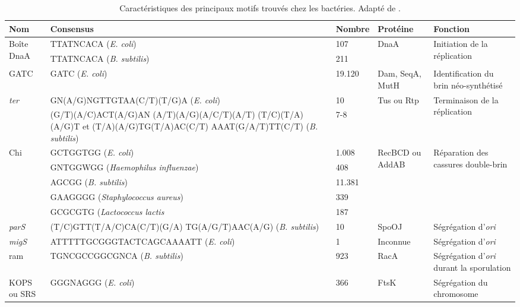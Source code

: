 \begin{table}[H]
	\footnotesize
	\hspace{-2.5cm}
	\caption[Caractéristiques des principaux motifs trouvés chez les bactéries]{Caractéristiques des principaux motifs trouvés chez les bactéries. Adapté de \citep{Touzain2011}.}
	\label{tabmotif2}
	\begin{tabular}{p{}|>{\scriptsize}p{}p{}|p{}p{}}
	\textbf{Nom} & \textbf{\footnotesize Consensus} & \textbf{Nombre} & \textbf{Protéine} & \textbf{Fonction}\\
	\hline
	\multirow{2}{0.15\textwidth}{Boîte DnaA} & TTATNCACA (\textit{E. coli}) & 107 & DnaA & \multirow{2}{0.2\textwidth}{Initiation de la réplication}\\
	\cline{2-3}
	 & TTATNCACA (\textit{B. subtilis}) & 211\\
	\hline
	GATC & GATC (\textit{E. coli}) & 19.120 & Dam, SeqA, MutH & Identification du brin néo-synthétisé\\
	\hline
	\multirow{2}{0.15\textwidth}{\textit{ter}} & GN(A/G)NGTTGTAA(C/T)(T/G)A (\textit{E. coli}) & 10 & Tus ou Rtp & \multirow{2}{0.2\textwidth}{Terminaison de la réplication}\\
	\cline{2-3}
	 & (G/T)(A/C)ACT(A/G)AN (A/T)(A/G)(A/C/T)(A/T) (T/C)(T/A)(A/G)T et (T/A)(A/G)TG(T/A)AC(C/T) AAAT(G/A/T)TT(C/T) (\textit{B. subtilis}) & 7-8 & \\
	\hline
	\multirow{5}{0.15\textwidth}{Chi} & GCTGGTGG (\textit{E. coli}) & 1.008 & \multirow{5}{0.15\textwidth}{RecBCD ou AddAB} & \multirow{5}{0.2\textwidth}{Réparation des cassures double-brin}\\
	\cline{2-3}
	 & GNTGGWGG (\textit{Haemophilus influenzae}) & 408\\
	\cline{2-3}
 	& AGCGG (\textit{B. subtilis}) & 11.381\\
	\cline{2-3}
 	& GAAGGGG (\textit{Staphylococcus aureus}) & 339\\
	\cline{2-3}
 	& GCGCGTG (\textit{Lactococcus lactis} & 187\\
	\hline
	\textit{parS} & (T/C)GTT(T/A/C)CA(C/T)(G/A) TG(A/G/T)AAC(A/G) (\textit{B. subtilis}) & 10 & SpoOJ & Ségrégation d'\textit{ori}\\
	\hline
	\textit{migS} & ATTTTTGCGGGTACTCAGCAAAATT (\textit{E. coli}) & 1 & Inconnue & Ségrégation d'\textit{ori}\\
	\hline
	ram & TGNCGCCGGCGNCA (\textit{B. subtilis}) & 923 & RacA & Ségrégation d'\textit{ori} durant la sporulation\\
	\hline
	KOPS ou SRS & GGGNAGGG (\textit{E. coli}) & 366 & FtsK & Ségrégation du chromosome
	\end{tabular}
	\label{tabmotif2}
\end{table}
			
